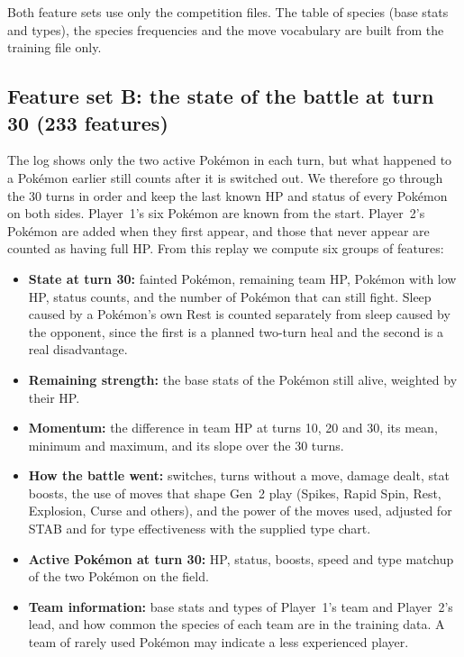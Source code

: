 \documentclass[11pt,a4paper]{article}
\begin{document}
Both feature sets use only the competition files. The table of species (base stats and types), the
species frequencies and the move vocabulary are built from the training file only.

\subsection{Feature set B: the state of the battle at turn 30 (233 features)}

The log shows only the two active Pokémon in each turn, but what happened to a Pokémon earlier
still counts after it is switched out. We therefore go through the 30 turns in order and keep the
last known HP and status of every Pokémon on both sides. Player~1's six Pokémon are known from the
start. Player~2's Pokémon are added when they first appear, and those that never appear are counted
as having full HP. From this replay we compute six groups of features:

\begin{itemize}
\item \textbf{State at turn 30:} fainted Pokémon, remaining team HP, Pokémon with low HP, status
counts, and the number of Pokémon that can still fight. Sleep caused by a Pokémon's own Rest is
counted separately from sleep caused by the opponent, since the first is a planned two-turn heal
and the second is a real disadvantage.
\item \textbf{Remaining strength:} the base stats of the Pokémon still alive, weighted by their HP.
\item \textbf{Momentum:} the difference in team HP at turns 10, 20 and 30, its mean, minimum and
maximum, and its slope over the 30 turns.
\item \textbf{How the battle went:} switches, turns without a move, damage dealt, stat boosts, the
use of moves that shape Gen~2 play (Spikes, Rapid Spin, Rest, Explosion, Curse and others), and the
power of the moves used, adjusted for STAB and for type effectiveness with the supplied type chart.
\item \textbf{Active Pokémon at turn 30:} HP, status, boosts, speed and type matchup of the two
Pokémon on the field.
\item \textbf{Team information:} base stats and types of Player~1's team and Player~2's lead, and
how common the species of each team are in the training data. A team of rarely used Pokémon may
indicate a less experienced player.
\end{itemize}
\end{document}
